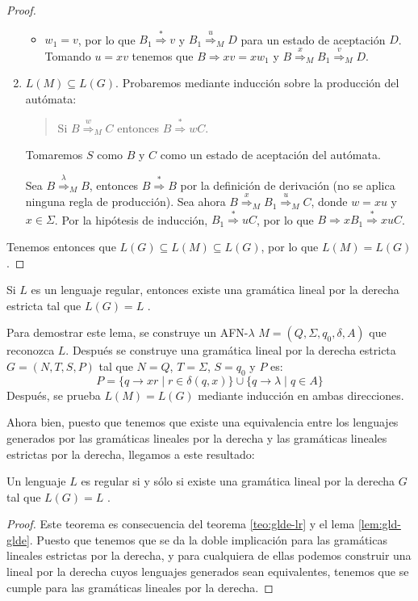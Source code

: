 \begin{proof}
\begin{enumerate}
\begin{itemize}
        \item $w_1=v$, por lo que $B_1\overset{*}{\Rightarrow}v$ y $B_1\overset{u}{\Rightarrow}_MD$ para un estado de
        aceptación $D$. Tomando $u=xv$ tenemos que $B\Rightarrow xv=xw_1$ y 
        $B\overset{x}{\Rightarrow}_MB_1\overset{v}{\Rightarrow}_MD$.
    \end{itemize}
    \item $L(M)\subseteq L(G)$. Probaremos mediante inducción sobre la producción del autómata:
    \begin{quote}
        Si $B\overset{w}{\Rightarrow}_MC$ entonces $B\overset{*}{\Rightarrow}wC$.
    \end{quote}
    Tomaremos $S$ como $B$ y $C$ como un estado de aceptación del autómata.

    Sea $B\overset{\lambda}{\Rightarrow}_MB$, entonces $B\overset{*}{\Rightarrow}B$ por la definición de derivación
    (no se aplica ninguna regla de producción). Sea ahora $B\overset{x}{\Rightarrow}_MB_1\overset{u}{\Rightarrow}_MC$,
    donde $w=xu$ y $x\in\Sigma$. Por la hipótesis de inducción, $B_1\overset{*}{\Rightarrow}uC$, por lo que 
    $B\Rightarrow xB_1\overset{*}{\Rightarrow}xuC$.
\end{enumerate}
Tenemos entonces que $L(G)\subseteq L(M)\subseteq L(G)$, por lo que $L(M)=L(G)$ \cite{pfenning_2000}.
\end{proof}

\begin{lema}\label{lem:r-gl}Si $L$ es un lenguaje regular, entonces existe una gramática lineal por la derecha 
estricta tal que $L(G)=L$ \cite{pfenning_2000}.
\end{lema}

Para demostrar este lema, se construye un AFN-$\lambda$ $M=(Q,\Sigma,q_0,\delta,A)$ que reconozca $L$. Después se
construye una gramática lineal por la derecha estricta $G=(N,T,S,P)$ tal que $N=Q$, $T=\Sigma$, $S=q_0$ y $P$ es:
\begin{equation}
    P=\{q\to xr\mid r\in\delta(q,x)\}\cup\{q\to\lambda\mid q\in A\}
\end{equation}
Después, se prueba $L(M)=L(G)$ mediante inducción en ambas direcciones\cite{pfenning_2000}.

Ahora bien, puesto que tenemos que existe una equivalencia entre los lenguajes generados por las gramáticas lineales
por la derecha y las gramáticas lineales estrictas por la derecha, llegamos a este resultado:

\begin{teorema}\label{teo:gld-lr}Un lenguaje $L$ es regular si y sólo si existe una gramática lineal por la derecha 
$G$ tal que $L(G)=L$ \cite{pfenning_2000}.
\end{teorema}
\begin{proof}
Este teorema es consecuencia del teorema \ref{teo:glde-lr} y el lema \ref{lem:gld-glde}. Puesto que tenemos que se
da la doble implicación para las gramáticas lineales estrictas por la derecha, y para cualquiera de ellas podemos
construir una lineal por la derecha cuyos lenguajes generados sean equivalentes, tenemos que se cumple para las 
gramáticas lineales por la derecha.
\end{proof}


